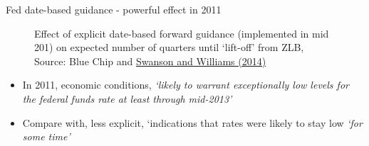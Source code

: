 \begin{frame}{Fed date-based guidance - powerful effect in 2011}

\begin{figure}
\begin{center}


\end{center}
\caption{Effect of explicit date-based forward guidance (implemented in mid 201) on expected number of quarters until `lift-off' from ZLB, Source: Blue Chip and \href{https://pubs.aeaweb.org/doi/pdfplus/10.1257/aer.104.10.3154}{Swanson and Williams (2014)}}
\end{figure}

\begin{itemize}
\item	In 2011, economic conditions, \emph{`likely to warrant exceptionally low levels for the federal funds rate at least through mid-2013'}
\item	Compare with, less explicit, `indications that rates were likely to stay low \emph{`for some time'}
\end{itemize}

\end{frame}


	
